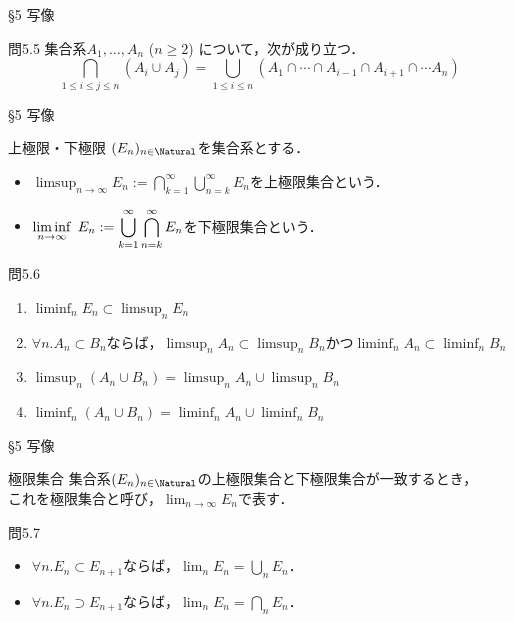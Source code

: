 \documentclass[uplatex,a4paper,dvipdfmx,aspectratio=169,11pt]{beamer}
\begin{document}
\begin{frame}[fragile]{\S 5 写像}
    \begin{exampleblock}{問5.5}
        集合系$A_1, \ldots, A_n$ ($n \ge 2$) について，次が成り立つ．
        \begin{equation*}
            \bigcap_{1 \le i \le j \le n}(A_i \cup A_j) = \bigcup_{1 \le i \le n} (A_1 \cap \cdots \cap A_{i - 1} \cap A_{i + 1} \cap \cdots A_n)
        \end{equation*}
    \end{exampleblock}
\end{frame}

\begin{frame}[fragile]{\S 5 写像}
    \begin{block}{上極限・下極限}
        $(E_n)_{n \in \Natural}$を集合系とする．
        \begin{itemize}
            \item $\displaystyle \limsup_{n \to \infty} E_n := \bigcap_{k = 1}^\infty \bigcup_{n = k}^\infty E_n$を\alert{上極限集合}という．
            \item $\displaystyle \liminf_{n \to \infty}\hspace{0.3em} E_n := \bigcup_{k = 1}^\infty \bigcap_{n = k}^\infty E_n$を\alert{下極限集合}という．
        \end{itemize}
    \end{block}

    \begin{exampleblock}{問5.6}
        \begin{enumerate}[(1)]
            \item $\liminf_n E_n \subset \limsup_n E_n$
            \item $\forall n. A_n \subset B_n$ならば，$\limsup_n A_n \subset \limsup_n B_n$かつ$\liminf_n A_n \subset \liminf_n B_n$
            \item[(3)] $\limsup_n (A_n \cup B_n) = \limsup_n A_n \cup \limsup_n B_n$
            \item[(4)] $\liminf_n (A_n \cup B_n) = \liminf_n A_n \cup \liminf_n B_n$
        \end{enumerate}
    \end{exampleblock}
\end{frame}

\begin{frame}[fragile]{\S 5 写像}
    \begin{block}{極限集合}
        集合系$(E_n)_{n \in \Natural}$の上極限集合と下極限集合が一致するとき，\\これを\alert{極限集合}と呼び，$\displaystyle \lim_{n \to \infty} E_n$で表す．
    \end{block}

    \begin{exampleblock}{問5.7}
        \begin{itemize}
            \item $\forall n. E_n \subset E_{n+1}$ならば，$\lim_n E_n = \bigcup_n E_n$．
            \item $\forall n. E_n \supset E_{n+1}$ならば，$\lim_n E_n = \bigcap_n E_n$．
        \end{itemize}
    \end{exampleblock}
\end{frame}
\end{document}
